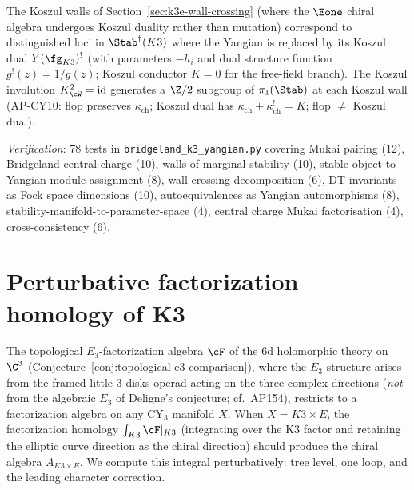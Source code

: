 \begin{remark}
\label{rem:bridgeland-koszul-walls}
The Koszul walls of Section~\ref{sec:k3e-wall-crossing} (where the $\Eone$ chiral algebra undergoes Koszul duality rather than mutation) correspond to distinguished loci in $\Stab^\dagger(K3)$ where the Yangian is replaced by its Koszul dual $Y(\fg_{K3})^!$ (with parameters $-h_i$ and dual structure function $g^!(z) = 1/g(z)$; Koszul conductor $K = 0$ for the free-field branch).  The Koszul involution $K_{\cW}^2 = \mathrm{id}$ generates a $\Z/2$ subgroup of $\pi_1(\Stab)$ at each Koszul wall (AP-CY10: flop preserves $\kappa_{\mathrm{ch}}$; Koszul dual has $\kappa_{\mathrm{ch}} + \kappa_{\mathrm{ch}}^! = K$; flop $\neq$ Koszul dual).
\end{remark}

\noindent\textit{Verification}: 78 tests in \texttt{bridgeland\_k3\_yangian.py} covering Mukai pairing (12), Bridgeland central charge (10), walls of marginal stability (10), stable-object-to-Yangian-module assignment (8), wall-crossing decomposition (6), DT invariants as Fock space dimensions (10), autoequivalences as Yangian automorphisms (8), stability-manifold-to-parameter-space (4), central charge Mukai factorisation (4), cross-consistency (6).



\section{Perturbative factorization homology of K3}
\label{sec:k3-perturbative-fact-homology}

The topological $E_3$-factorization algebra $\cF$ of the 6d holomorphic
theory on $\C^3$ (Conjecture~\ref{conj:topological-e3-comparison}), where
the $E_3$ structure arises from the framed little $3$-disks operad
acting on the three complex directions (\emph{not} from the algebraic
$E_3$ of Deligne's conjecture; cf.\ AP154), restricts to a factorization
algebra on any CY$_3$ manifold $X$.
When $X = K3 \times E$, the factorization homology
$\int_{K3} \cF|_{K3}$ (integrating over the K3 factor and retaining
the elliptic curve direction as the chiral direction) should
produce the chiral algebra $A_{K3 \times E}$. We compute this
integral perturbatively: tree level, one loop, and the leading
character correction.

